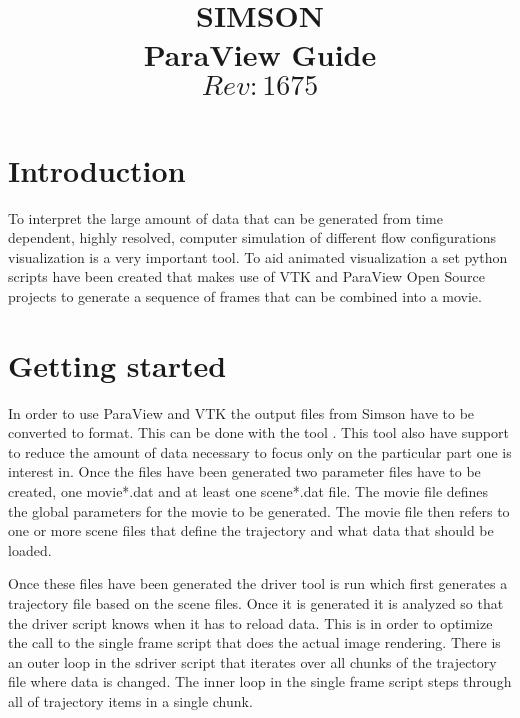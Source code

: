 \documentclass[10pt,a4paper]{simson}
\title{\textbf{SIMSON}\\ParaView Guide\\ $Rev: 1675 $}
\author{}
\begin{document}
\maketitle

\tableofcontents*


\chapter{Introduction}
\setcounter{page}{1} To interpret the large
amount of data that can be generated from time dependent, highly
resolved, computer simulation of different flow configurations
visualization is a very important tool. To aid animated visualization
a set python scripts have been created that makes use of VTK \cite{}
and ParaView Open Source projects to generate a sequence of frames
that can be combined into a movie.


\chapter{Getting started}
In order to use ParaView and VTK the output files from Simson have to
be converted to  format. This can be done with the tool
. This tool also have support to reduce the amount of
data necessary to focus only on the particular part one is interest
in. Once the  files have been generated two parameter
files have to be created, one movie*.dat and at least one scene*.dat
file. The movie file defines the global parameters for the movie to be
generated. The movie file then refers to one or more scene files that
define the trajectory and what data that should be loaded.

Once these files have been generated the driver tool is run which
first generates a trajectory file based on the scene files. Once it is
generated it is analyzed so that the driver script knows when it has
to reload data. This is in order to optimize the call to the single
frame script that does the actual image rendering. There is an outer
loop in the sdriver script that iterates over all chunks of the
trajectory file where data is changed. The inner loop in the single
frame script steps through all of trajectory items in a single chunk.
\end{document}
